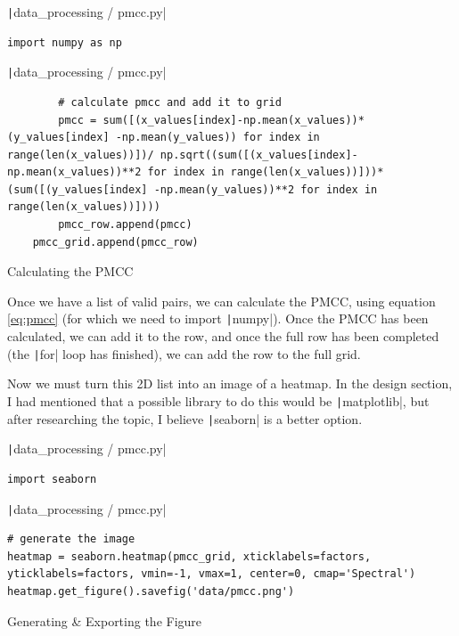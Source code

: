 \documentclass[12pt]{report}
\newcommand{\pil}[1]{\protect\texttt|#1|}
\begin{document}
\begin{listing}[H]
\pil{data_processing / pmcc.py}
\begin{verbatim}
import numpy as np
\end{verbatim}
\pil{data_processing / pmcc.py}
\begin{verbatim}
        # calculate pmcc and add it to grid
        pmcc = sum([(x_values[index]-np.mean(x_values))*(y_values[index] -np.mean(y_values)) for index in range(len(x_values))])/ np.sqrt((sum([(x_values[index]-np.mean(x_values))**2 for index in range(len(x_values))]))*(sum([(y_values[index] -np.mean(y_values))**2 for index in range(len(x_values))])))
        pmcc_row.append(pmcc)
    pmcc_grid.append(pmcc_row)
\end{verbatim}
\caption{Calculating the PMCC}\label{cs:calcPMCC}
\end{listing}

Once we have a list of valid pairs, we can calculate the PMCC, using equation \ref{eq:pmcc} (for which we need to import \pil{numpy}). Once the PMCC has been calculated, we can add it to the row, and once the full row has been completed (the \pil{for} loop has finished), we can add the row to the full grid.

\begin{center}
\end{center}

Now we must turn this 2D list into an image of a heatmap. In the design section, I had mentioned that a possible library to do this would be \pil{matplotlib}, but after researching the topic, I believe \pil{seaborn} is a better option.

\begin{listing}[H]
\pil{data_processing / pmcc.py}
\begin{verbatim}
import seaborn
\end{verbatim}
\pil{data_processing / pmcc.py}
\begin{verbatim}
# generate the image
heatmap = seaborn.heatmap(pmcc_grid, xticklabels=factors, yticklabels=factors, vmin=-1, vmax=1, center=0, cmap='Spectral')
heatmap.get_figure().savefig('data/pmcc.png')
\end{verbatim}
\caption{Generating \& Exporting the Figure}\label{cs:exportPMCC}
\end{listing}
\end{document}
